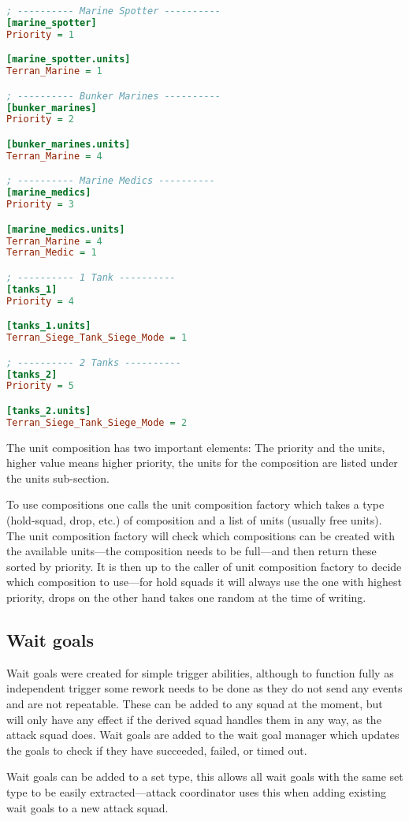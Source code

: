\begin{lstlisting}[caption={Hold squad unit compositions},label={lst:unit_composition_defense},language=ini]
; ---------- Marine Spotter ----------
[marine_spotter]
Priority = 1

[marine_spotter.units]
Terran_Marine = 1

; ---------- Bunker Marines ----------
[bunker_marines]
Priority = 2

[bunker_marines.units]
Terran_Marine = 4

; ---------- Marine Medics ----------
[marine_medics]
Priority = 3

[marine_medics.units]
Terran_Marine = 4
Terran_Medic = 1

; ---------- 1 Tank ----------
[tanks_1]
Priority = 4

[tanks_1.units]
Terran_Siege_Tank_Siege_Mode = 1

; ---------- 2 Tanks ----------
[tanks_2]
Priority = 5

[tanks_2.units]
Terran_Siege_Tank_Siege_Mode = 2
\end{lstlisting}
The unit composition has two important elements: The priority and the units, higher value means higher priority, the units for the composition are listed under the units sub-section.

To use compositions one calls the unit composition factory which takes a type (hold-squad, drop, etc.) of composition and a list of units (usually free units). The unit composition factory will check which compositions can be created with the available units—the composition needs to be full—and then return these sorted by priority. It is then up to the caller of unit composition factory to decide which composition to use—for hold squads it will always use the one with highest priority, drops on the other hand takes one random at the time of writing.

\subsection{Wait goals}
\label{sec:wait_goals}
Wait goals were created for simple trigger abilities, although to function fully as independent trigger some rework needs to be done as they do not send any events and are not repeatable. These can be added to any squad at the moment, but will only have any effect if the derived squad handles them in any way, as the attack squad does. Wait goals are added to the wait goal manager which updates the goals to check if they have succeeded, failed, or timed out.

Wait goals can be added to a set type, this allows all wait goals with the same set type to be easily extracted—attack coordinator uses this when adding existing wait goals to a new attack squad.